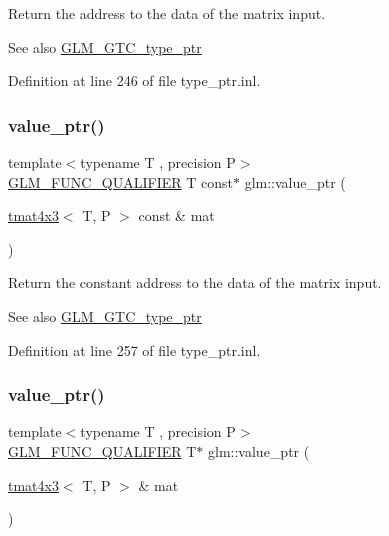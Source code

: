Return the address to the data of the matrix input. \begin{DoxySeeAlso}{See also}
\mbox{\hyperlink{group__gtc__type__ptr}{G\+L\+M\+\_\+\+G\+T\+C\+\_\+type\+\_\+ptr}} 
\end{DoxySeeAlso}


Definition at line 246 of file type\+\_\+ptr.\+inl.

\mbox{\label{group__gtc__type__ptr_ga72b0a496d6c190645accac32f48f64bb}} 
\subsubsection{\texorpdfstring{value\_ptr()}{value\_ptr()}\hspace{0.1cm}{\footnotesize\ttfamily [24/27]}}
{\footnotesize\ttfamily template$<$typename T , precision P$>$ \\
\mbox{\hyperlink{setup_8hpp_a33fdea6f91c5f834105f7415e2a64407}{G\+L\+M\+\_\+\+F\+U\+N\+C\+\_\+\+Q\+U\+A\+L\+I\+F\+I\+ER}} T const$\ast$ glm\+::value\+\_\+ptr (\begin{DoxyParamCaption}\item[{\mbox{\hyperlink{structglm_1_1tmat4x3}{tmat4x3}}$<$ T, P $>$ const \&}]{mat }\end{DoxyParamCaption})}

Return the constant address to the data of the matrix input. \begin{DoxySeeAlso}{See also}
\mbox{\hyperlink{group__gtc__type__ptr}{G\+L\+M\+\_\+\+G\+T\+C\+\_\+type\+\_\+ptr}} 
\end{DoxySeeAlso}


Definition at line 257 of file type\+\_\+ptr.\+inl.

\mbox{\label{group__gtc__type__ptr_gab9cba81cd8a7eb0afc9ac2b9f4fe05ca}} 
\subsubsection{\texorpdfstring{value\_ptr()}{value\_ptr()}\hspace{0.1cm}{\footnotesize\ttfamily [25/27]}}
{\footnotesize\ttfamily template$<$typename T , precision P$>$ \\
\mbox{\hyperlink{setup_8hpp_a33fdea6f91c5f834105f7415e2a64407}{G\+L\+M\+\_\+\+F\+U\+N\+C\+\_\+\+Q\+U\+A\+L\+I\+F\+I\+ER}} T$\ast$ glm\+::value\+\_\+ptr (\begin{DoxyParamCaption}\item[{\mbox{\hyperlink{structglm_1_1tmat4x3}{tmat4x3}}$<$ T, P $>$ \&}]{mat }\end{DoxyParamCaption})}

